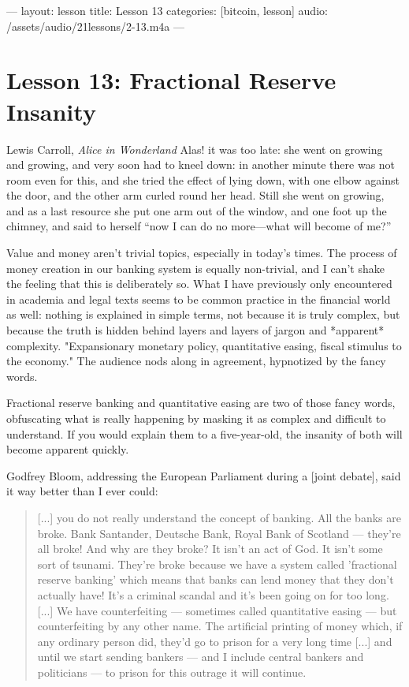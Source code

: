 ---
layout: lesson
title: Lesson 13
categories: [bitcoin, lesson]
audio: /assets/audio/21lessons/2-13.m4a
---

\chapter{Lesson 13: Fractional Reserve Insanity}
\label{les:13}

\begin{chapquote}{Lewis Carroll, \textit{Alice in Wonderland}}
Alas! it was too late: she went on growing and growing, and very soon had to
kneel down: in another minute there was not room even for this, and she tried
the effect of lying down, with one elbow against the door, and the other arm
curled round her head. Still she went on growing, and as a last resource she put
one arm out of the window, and one foot up the chimney, and said to herself
``now I can do no more—what will become of me?''
\end{chapquote}

Value and money aren't trivial topics, especially in today's times. The
process of money creation in our banking system is equally non-trivial,
and I can't shake the feeling that this is deliberately so. What I have
previously only encountered in academia and legal texts seems to be
common practice in the financial world as well: nothing is explained in
simple terms, not because it is truly complex, but because the truth is
hidden behind layers and layers of jargon and *apparent* complexity.
"Expansionary monetary policy, quantitative easing, fiscal stimulus to
the economy." The audience nods along in agreement, hypnotized by the
fancy words.

Fractional reserve banking and quantitative easing are two of those
fancy words, obfuscating what is really happening by masking it as
complex and difficult to understand. If you would explain them to a
five-year-old, the insanity of both will become apparent quickly.

Godfrey Bloom, addressing the European Parliament during a [joint
debate], said it way better than I ever could:

\begin{quotation}
[...] you do not really understand the concept of banking. All the
banks are broke. Bank Santander, Deutsche Bank, Royal Bank of
Scotland --- they're all broke! And why are they broke? It isn't an
act of God. It isn't some sort of tsunami. They're broke because we
have a system called 'fractional reserve banking' which means that
banks can lend money that they don't actually have! It's a criminal
scandal and it's been going on for too long. [...]
We have counterfeiting --- sometimes called quantitative
easing --- but counterfeiting by any other name. The artificial
printing of money which, if any ordinary person did, they'd go to
prison for a very long time [...] and until we start sending
bankers --- and I include central bankers and politicians --- to
prison for this outrage it will continue.
\end{quotation}

